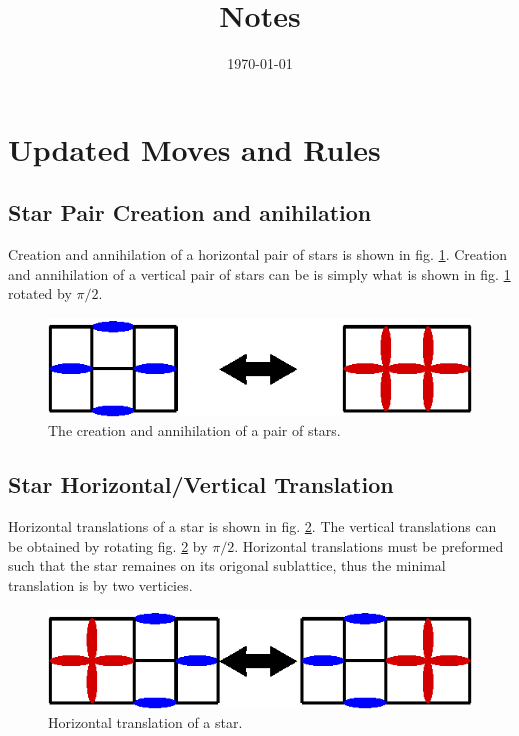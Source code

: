 \documentclass[aps,floatfix,11pt]{revtex4-1}
\begin{document}
\title{Notes}

\date{\today}

\begin{abstract}
    
\end{abstract}

\maketitle 

\section{Updated Moves and Rules}

\subsection{Star Pair Creation and anihilation}

Creation and annihilation of a horizontal pair of stars is shown in fig.
\ref{fig:create_annihilate_pair}. Creation and annihilation of a vertical pair of stars can be
is simply what is shown in fig. \ref{fig:create_annihilate_pair} rotated by $\pi/2$.

\begin{figure}[h]
    \centering
    \includegraphics[width=8.5 cm]{create_annihilate_pair}
    \caption{The creation and annihilation of a pair of stars.
\label{fig:create_annihilate_pair}}
\end{figure}

\subsection{Star Horizontal/Vertical Translation}
Horizontal translations of a star is shown in fig. \ref{fig:move_right_left}. The vertical
translations can be obtained by rotating fig. \ref{fig:move_right_left} by $\pi/2$. Horizontal
translations must be preformed such that the star remaines on its origonal sublattice, thus the
minimal translation is by two verticies.

\begin{figure}[h]
    \centering
    \includegraphics[width=8.5 cm]{move_right_left}
    \caption{Horizontal translation of a star.
\label{fig:move_right_left}}
\end{figure}
\end{document}
